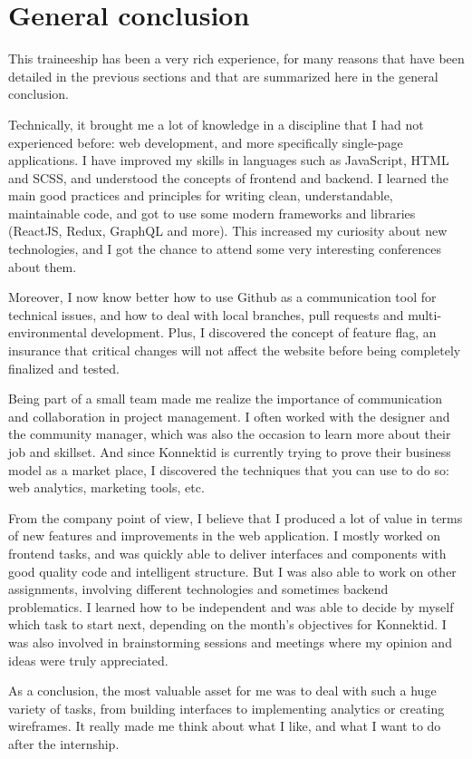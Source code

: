 \section{General conclusion}
\label{sec:conclusion}

This traineeship has been a very rich experience, for many reasons that have been detailed in the previous sections and that are summarized here in the general conclusion.

Technically, it brought me a lot of knowledge in a discipline that I had not experienced before: web development, and more specifically single-page applications. I have improved my skills in languages such as JavaScript, HTML and SCSS, and understood the concepts of frontend and backend. I learned the main good practices and principles for writing clean, understandable, maintainable code, and got to use some modern frameworks and libraries (ReactJS, Redux, GraphQL and more). This increased my curiosity about new technologies, and I got the chance to attend some very interesting conferences about them.

Moreover, I now know better how to use Github as a communication tool for technical issues, and how to deal with local branches, pull requests and multi-environmental development. Plus, I discovered the concept of feature flag, an insurance that critical changes will not affect the website before being completely finalized and tested.

Being part of a small team made me realize the importance of communication and collaboration in project management. I often worked with the designer and the community manager, which was also the occasion to learn more about their job and skillset. And since Konnektid is currently trying to prove their business model as a market place, I discovered the techniques that you can use to do so: web analytics, marketing tools, etc.

From the company point of view, I believe that I produced a lot of value in terms of new features and improvements in the web application. I mostly worked on frontend tasks, and was quickly able to deliver interfaces and components with good quality code and intelligent structure. But I was also able to work on other assignments, involving different technologies and sometimes backend problematics. I learned how to be independent and was able to decide by myself which task to start next, depending on the month's objectives for Konnektid. I was also involved in brainstorming sessions and meetings where my opinion and ideas were truly appreciated.

As a conclusion, the most valuable asset for me was to deal with such a huge variety of tasks, from building interfaces to implementing analytics or creating wireframes. It really made me think about what I like, and what I want to do after the internship.